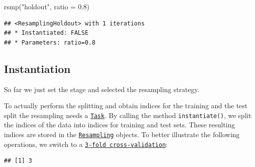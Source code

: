 \documentclass[
]{scrbook}
\newenvironment{Shaded}{\begin{snugshade}}{\end{snugshade}}
\newcommand{\AttributeTok}[1]{\textcolor[rgb]{0.77,0.63,0.00}{#1}}
\newcommand{\DecValTok}[1]{\textcolor[rgb]{0.00,0.00,0.81}{#1}}
\newcommand{\FloatTok}[1]{\textcolor[rgb]{0.00,0.00,0.81}{#1}}
\newcommand{\FunctionTok}[1]{\textcolor[rgb]{0.00,0.00,0.00}{#1}}
\newcommand{\NormalTok}[1]{#1}
\newcommand{\OtherTok}[1]{\textcolor[rgb]{0.56,0.35,0.01}{#1}}
\newcommand{\SpecialCharTok}[1]{\textcolor[rgb]{0.00,0.00,0.00}{#1}}
\newcommand{\StringTok}[1]{\textcolor[rgb]{0.31,0.60,0.02}{#1}}
\renewenvironment{Shaded} {\begin{snugshade}\small} {\end{snugshade}}
\begin{document}
\begin{Shaded}
\begin{Highlighting}[]
\FunctionTok{rsmp}\NormalTok{(}\StringTok{"holdout"}\NormalTok{, }\AttributeTok{ratio =} \FloatTok{0.8}\NormalTok{)}
\end{Highlighting}
\end{Shaded}

\begin{verbatim}
## <ResamplingHoldout> with 1 iterations
## * Instantiated: FALSE
## * Parameters: ratio=0.8
\end{verbatim}

\hypertarget{resampling-inst}{%
\subsection{Instantiation}\label{resampling-inst}}

So far we just set the stage and selected the resampling strategy.

To actually perform the splitting and obtain indices for the training and the test split the resampling needs a \href{https://mlr3.mlr-org.com/reference/Task.html}{\texttt{Task}}.
By calling the method \texttt{instantiate()}, we split the indices of the data into indices for training and test sets.
These resulting indices are stored in the \href{https://mlr3.mlr-org.com/reference/Resampling.html}{\texttt{Resampling}} objects.
To better illustrate the following operations, we switch to a \href{https://mlr3.mlr-org.com/reference/mlr_resamplings_cv.html}{\texttt{3-fold\ cross-validation}}:

\begin{Shaded}
\end{Shaded}

\begin{verbatim}
## [1] 3
\end{verbatim}

\begin{Shaded}
\end{Shaded}
\end{document}

